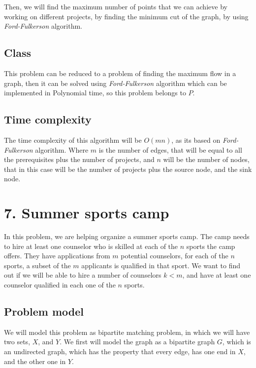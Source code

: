 \documentclass{article}
\begin{document}
Then, we will find the maximum number of points that we can achieve by working on different projects, by finding the minimum cut of the graph, by using \textit{Ford-Fulkerson} algorithm.

\subsection*{Class}

This problem can be reduced to a problem of finding the maximum flow in a graph, then it can be solved using \textit{Ford-Fulkerson} algorithm which can be implemented in Polynomial time, so this problem belongs to $P$.


\subsection*{Time complexity}

The time complexity of this algorithm will be $O(mn)$, as its based on \textit{Ford-Fulkerson} algorithm. Where $m$ is the number of edges, that will be equal to all the prerequisites plus the number of projects, and $n$ will be the number of nodes, that in this case will be the number of projects plus the source node, and the sink node.

\section*{7. Summer sports camp}

In this problem, we are helping organize a summer sports camp. The camp needs to hire at least one counselor who is skilled at each of the $n$ sports the camp offers. They have applications from $m$ potential counselors, for each of the $n$ sports, a subset of the $m$ applicants is qualified in that sport. We want to find out if we will be able to hire a number of counselors $k<m$, and have at least one counselor qualified in each one of the $n$ sports. 

\subsection*{Problem model}

We will model this problem as bipartite matching problem, in which we will have two sets, $X$, and $Y$. We first will model the graph as a bipartite graph $G$, which is an undirected graph, which has the property that every edge, has one end in $X$, and the other one in $Y$.
\end{document}
